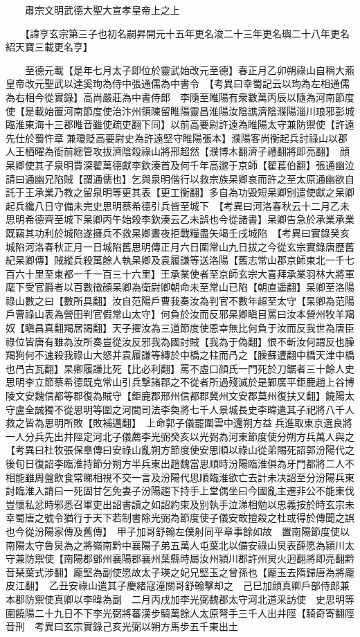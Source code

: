　　肅宗文明武德大聖大宣孝皇帝上之上

　　【諱亨玄宗第三子也初名嗣昇開元十五年更名浚二十三年更名璵二十八年更名紹天寶三載更名亨】

　　至德元載【是年七月太子即位於靈武始改元至德】春正月乙卯朔祿山自稱大燕皇帝改元聖武以達奚珣為侍中張通儒為中書令　【考異曰幸蜀記云以珣為左相通儒為右相今從實錄】高尚嚴莊為中書侍郎　李隨至睢陽有衆數萬丙辰以隨為河南節度使【是載始置河南節度使治汴州領陳留睢陽靈昌淮陽汝陰譙濟陰濮陽淄川琅邪彭城臨淮東海十三郡睢音雖使疏吏翻下同】以前高要尉許遠為睢陽太守兼防禦使【許遠先仕於蜀忤章兼瓊貶高要尉史為許遠堅守睢陽張本】濮陽客尚衡起兵討祿山以郡人王栖曜為衙前總管攻拔濟陰殺祿山將邢超然【濮博木翻濟子禮翻將即亮翻】　顔杲卿使其子泉明賈深翟萬德獻李欽湊首及何千年高邈于京師【翟萇伯翻】張通幽泣請曰通幽兄陷賊【謂通儒也】乞與泉明偕行以救宗族杲卿哀而許之至太原通幽欲自託于王承業乃教之留泉明等更其表【更工衡翻】多自為功毁短杲卿别遣使獻之杲卿起兵纔八日守備未完史思明蔡希德引兵皆至城下　【考異曰河洛春秋云十二月乙未思明希德齊至城下杲卿丙午始殺李欽湊云乙未誤也今從諸書】杲卿告急於承業承業既竊其功利於城陷遂擁兵不救杲卿晝夜拒戰糧盡矢竭壬戌城陷　【考異曰實錄癸亥城陷河洛春秋正月一日城陷舊思明傳正月六日圍常山九日拔之今從玄宗實錄唐歷舊紀杲卿傳】賊縱兵殺萬餘人執杲卿及袁履謙等送洛陽【舊志常山郡京師東北一千七百六十里至東都一千一百三十六里】王承業使者至京師玄宗大喜拜承業羽林大將軍麾下受官爵者以百數徵顔杲卿為衛尉卿朝命未至常山已陷【朝直遥翻】杲卿至洛陽祿山數之曰【數所具翻】汝自范陽戶曹我奏汝為判官不數年超至太守【杲卿為范陽戶曹祿山表為營田判官假常山太守】何負於汝而反邪杲卿瞋目罵曰汝本營州牧羊羯奴【瞋昌真翻羯居謁翻】天子擢汝為三道節度使恩幸無比何負于汝而反我世為唐臣祿位皆唐有雖為汝所奏豈從汝反邪我為國討賊【我為于偽翻】恨不斬汝何謂反也臊羯狗何不速殺我祿山大怒并袁履謙等縳於中橋之柱而冎之【臊蘇遭翻中橋天津中橋也冎古瓦翻】杲卿履謙比死【比必利翻】罵不虛口顔氏一門死於刀鋸者三十餘人史思明李立節蔡希德既克常山引兵撃諸郡之不從者所過殘滅於是鄴廣平鉅鹿趙上谷博陵文安魏信都等郡復為賊守【鉅鹿郡邢州信都郡冀州文安郡莫州復扶又翻】饒陽太守盧全誠獨不從思明等圍之河間司法李奐將七千人景城長史李暐遣其子祀將八千人救之皆為思明所敗【敗補邁翻】　上命郭子儀罷圍雲中還朔方益兵進取東京選良將一人分兵先出井陘定河北子儀薦李光弼癸亥以光弼為河東節度使分朔方兵萬人與之　【考異曰杜牧張保臯傳曰安祿山亂朔方節度使安思順以祿山從弟賜死詔郭汾陽代之後旬日復詔李臨淮持節分朔方半兵東出趙魏當思順時汾陽臨淮俱為牙門都將二人不相能雖周盤飲食常睇相視不交一言及汾陽代思順臨淮欲亡去計未决詔至分汾陽兵東討臨淮入請曰一死固甘乞免妻子汾陽趨下持手上堂偶坐曰今國亂主遷非公不能東伐豈懷私忿時邪悉召軍吏出詔書讀之如詔約束及别執手泣涕相勉以忠義按於時玄宗未幸蜀唐之號令猶行于天下若制書除光弼為節度使子儀安敢擅殺之杜或得於傳聞之誤也今從汾陽家傳及舊傳】　甲子加哥舒翰左僕射同平章事餘如故　置南陽節度使以南陽太守魯炅為之將嶺南黔中襄陽子弟五萬人屯葉北以備安祿山炅表薛愿為潁川太守兼防禦使【南陽郡鄧州襄陽郡襄州葉縣時屬汝州潁川郡許州炅火迥翻將即亮翻黔音琹葉式涉翻】龎堅為副使愿故太子瑛之妃兄堅玉之曾孫也【龎玉去隋歸唐為將龎皮江翻】　乙丑安祿山遣其子慶緒寇潼關哥舒翰擊却之　己巳加顔真卿戶部侍郎兼本郡防禦使真卿以李暐為副　二月丙戌加李光弼魏郡太守河北道采訪使　史思明等圍饒陽二十九日不下李光弼將蕃漢步騎萬餘人太原弩手三千人出井陘【騎奇寄翻陘音刑　考異曰玄宗實錄己亥光弼以朔方馬步五千東出土